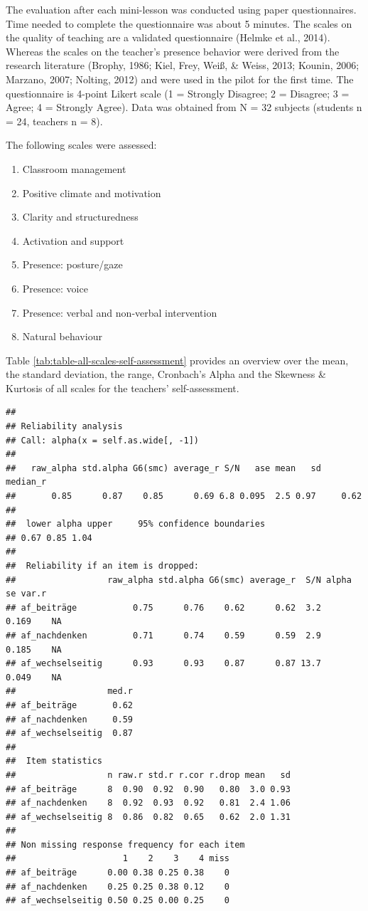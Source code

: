 \documentclass[
  english,
  man,floatsintext]{apa6}
\providecommand{\tightlist}{%
  \setlength{\itemsep}{0pt}\setlength{\parskip}{0pt}}
\begin{document}
The evaluation after each mini-lesson was conducted using paper questionnaires. Time needed to complete the questionnaire was about 5 minutes.
The scales on the quality of teaching are a validated questionnaire (Helmke et al., 2014). Whereas the scales on the teacher's presence behavior were derived from the research literature (Brophy, 1986; Kiel, Frey, Weiß, \& Weiss, 2013; Kounin, 2006; Marzano, 2007; Nolting, 2012) and were used in the pilot for the first time. The questionnaire is 4-point Likert scale (1 = Strongly Disagree; 2 = Disagree; 3 = Agree; 4 = Strongly Agree). Data was obtained from N = 32 subjects (students n = 24, teachers n = 8).

The following scales were assessed:

\begin{enumerate}
\def\labelenumi{(\arabic{enumi})}
\tightlist
\item
  Classroom management
\item
  Positive climate and motivation
\item
  Clarity and structuredness
\item
  Activation and support
\item
  Presence: posture/gaze
\item
  Presence: voice
\item
  Presence: verbal and non-verbal intervention
\item
  Natural behaviour
\end{enumerate}

Table \ref{tab:table-all-scales-self-assessment} provides an overview over the mean, the standard deviation, the range, Cronbach's Alpha and the Skewness \& Kurtosis of all scales for the teachers' self-assessment.

\begin{verbatim}
## 
## Reliability analysis   
## Call: alpha(x = self.as.wide[, -1])
## 
##   raw_alpha std.alpha G6(smc) average_r S/N   ase mean   sd median_r
##       0.85      0.87    0.85      0.69 6.8 0.095  2.5 0.97     0.62
## 
##  lower alpha upper     95% confidence boundaries
## 0.67 0.85 1.04 
## 
##  Reliability if an item is dropped:
##                  raw_alpha std.alpha G6(smc) average_r  S/N alpha se var.r
## af_beiträge           0.75      0.76    0.62      0.62  3.2    0.169    NA
## af_nachdenken         0.71      0.74    0.59      0.59  2.9    0.185    NA
## af_wechselseitig      0.93      0.93    0.87      0.87 13.7    0.049    NA
##                  med.r
## af_beiträge       0.62
## af_nachdenken     0.59
## af_wechselseitig  0.87
## 
##  Item statistics 
##                  n raw.r std.r r.cor r.drop mean   sd
## af_beiträge      8  0.90  0.92  0.90   0.80  3.0 0.93
## af_nachdenken    8  0.92  0.93  0.92   0.81  2.4 1.06
## af_wechselseitig 8  0.86  0.82  0.65   0.62  2.0 1.31
## 
## Non missing response frequency for each item
##                     1    2    3    4 miss
## af_beiträge      0.00 0.38 0.25 0.38    0
## af_nachdenken    0.25 0.25 0.38 0.12    0
## af_wechselseitig 0.50 0.25 0.00 0.25    0
\end{verbatim}
\end{document}
